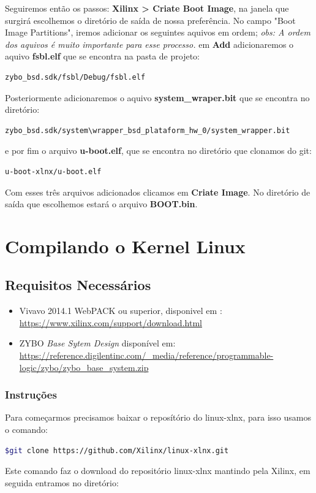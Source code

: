 \begin{anexosenv}
Seguiremos então os passos: \textbf{Xilinx > Criate Boot Image}, na janela que surgirá escolhemos o diretório de saída de nossa preferência. No campo "Boot Image Partitions", iremos adicionar os seguintes aquivos em ordem; \textit{obs: A ordem dos aquivos é muito importante para esse processo.}
em \textbf{Add} adicionaremos o aquivo \textbf{fsbl.elf} que se encontra na pasta de projeto:
\begin{lstlisting}[language=bash]
zybo_bsd.sdk/fsbl/Debug/fsbl.elf
\end{lstlisting}
Posteriormente adicionaremos o aquivo \textbf{system\_wraper.bit} que se encontra no diretório:
\begin{lstlisting}[language=bash]
zybo_bsd.sdk/system\wrapper_bsd_plataform_hw_0/system_wrapper.bit
\end{lstlisting}
e por fim o arquivo \textbf{u-boot.elf}, que se encontra no diretório que clonamos do git:
\begin{lstlisting}[language=bash]
u-boot-xlnx/u-boot.elf
\end{lstlisting}
Com esses três arquivos adicionados clicamos em \textbf{Criate Image}. No diretório de saída que escolhemos estará o arquivo \textbf{BOOT.bin}.


\section{Compilando o Kernel Linux}
\subsection{Requisitos Necessários}
\begin{itemize}
\item Vivavo 2014.1 WebPACK ou superior, disponivel em : \url{https://www.xilinx.com/support/download.html}
\item ZYBO \textit{Base Sytem Design}  disponível em: \url{https://reference.digilentinc.com/_media/reference/programmable-logic/zybo/zybo_base_system.zip}
\end{itemize}

\subsubsection{Instruções}

Para começarmos precisamos baixar o reposítório do linux-xlnx, para isso usamos o comando:
\begin{lstlisting}[language=bash]
$git clone https://github.com/Xilinx/linux-xlnx.git
\end{lstlisting}
Este comando faz o download do repositório linux-xlnx mantindo pela Xilinx, em seguida entramos no diretório:


\end{anexosenv}
